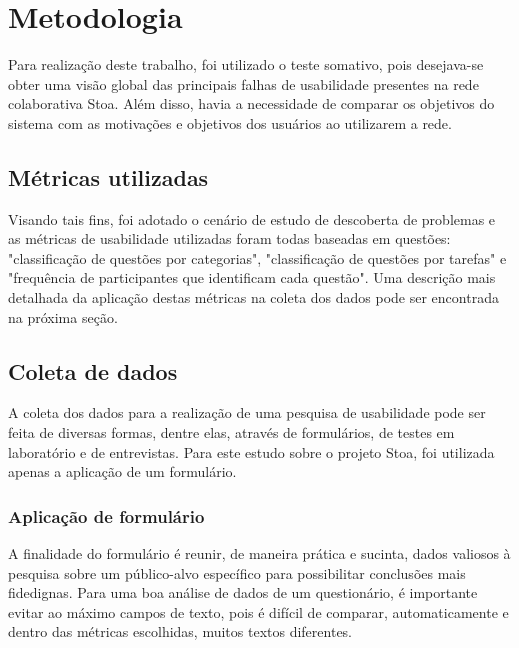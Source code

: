 \chapter{Metodologia}
\label{cap:metodologia}

	Para realização deste trabalho, foi utilizado o teste somativo, pois desejava-se obter uma visão global das principais falhas de usabilidade presentes na rede colaborativa Stoa. Além disso, havia a necessidade de comparar os objetivos do sistema com as motivações e objetivos dos usuários ao utilizarem a rede. 

\section{Métricas utilizadas}
\label{sec:metricas-usadas}

	Visando tais fins, foi adotado o cenário de estudo de descoberta de problemas \cite{tullis:13} e as métricas de usabilidade utilizadas foram todas baseadas em questões: "classificação de questões por categorias", "classificação de questões por tarefas" e "frequência de participantes que identificam cada questão". Uma descrição mais detalhada da aplicação destas métricas na coleta dos dados pode ser encontrada na próxima seção.
	
\section{Coleta de dados}
\label{sec:coleta-dados}

	A coleta dos dados para a realização de uma pesquisa de usabilidade pode ser feita de diversas formas, dentre elas, através de formulários, de testes em laboratório e de entrevistas. Para este estudo sobre o projeto Stoa, foi utilizada apenas a aplicação de um formulário. 
	
\subsection{Aplicação de formulário}
\label{sec:aplic-form}

	A finalidade do formulário é reunir, de maneira prática e sucinta, dados valiosos à pesquisa sobre um público-alvo específico para possibilitar conclusões mais fidedignas. Para uma boa análise de dados de um questionário, é importante evitar ao máximo campos de texto, pois é difícil de comparar, automaticamente e dentro das métricas escolhidas, muitos textos diferentes.
	

